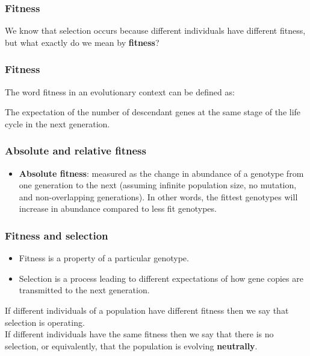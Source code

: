 \documentclass{beamer}
\newcommand{\1}{\ensuremath{\mathbf{1}}}
\begin{document}
%
%
%
\begin{frame}\frametitle{Fitness}
	We know that selection occurs because different individuals have different fitness, but what exactly do we mean by \textbf{fitness}?
\end{frame}
%
%
%
\begin{frame}\frametitle{Fitness}
	The word fitness in an evolutionary context can be defined as:
	\begin{block}{}
		The expectation of the number of descendant genes at the same stage of the life cycle in the next generation.
	\end{block}
\end{frame}
%
%
%
\begin{frame}\frametitle{Absolute and relative fitness}
	\begin{itemize}
		\item \textbf{Absolute fitness}: measured as the change in abundance of a genotype from one generation to the next (assuming infinite population size, no mutation, and non-overlapping generations). In other words, the fittest genotypes will increase in abundance compared to less fit genotypes.
	\end{itemize}
\end{frame}
%
%
%
\begin{frame}\frametitle{Fitness and selection}
	\begin{itemize}
		\item Fitness is a property of a particular genotype.
		\item Selection is a process leading to different expectations of how gene copies are transmitted to the next generation.
	\end{itemize}
	\vspace{2ex}If different individuals of a population have different fitness then we say that selection is operating.\\[2ex]
	If different individuals have the same fitness then we say that there is no selection, or equivalently, that the population is evolving \textbf{neutrally}.
\end{frame}
\end{document}
